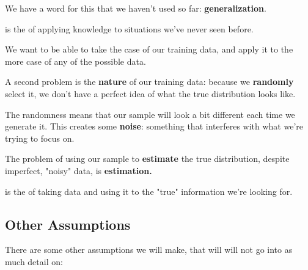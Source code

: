         We have a word for this that we haven't used so far: \textbf{generalization}.\\
        
        \begin{definition}
             is the  of applying  knowledge to  situations we've never seen before.
            
            We want to be able to take the  case of our training data, and apply it to the more  case of any of the possible  data.
        \end{definition}
        
        A second problem is the \textbf{nature} of our training data: because we \textbf{randomly} select it, we don't have a perfect idea of what the true distribution looks like.
        
        The randomness means that our sample will look a bit different each time we generate it. This creates some \textbf{noise}: something that interferes with what we're trying to focus on. 
        
        The problem of using our sample to \textbf{estimate} the true distribution, despite imperfect, "noisy" data, is \textbf{estimation.}\\
        
        \begin{definition}
             is the  of taking  data and using it to  the "true" information we're looking for.
        \end{definition}
        
    \subsection{Other Assumptions}
    
        There are some other assumptions we will make, that will will not go into as much detail on:
        
